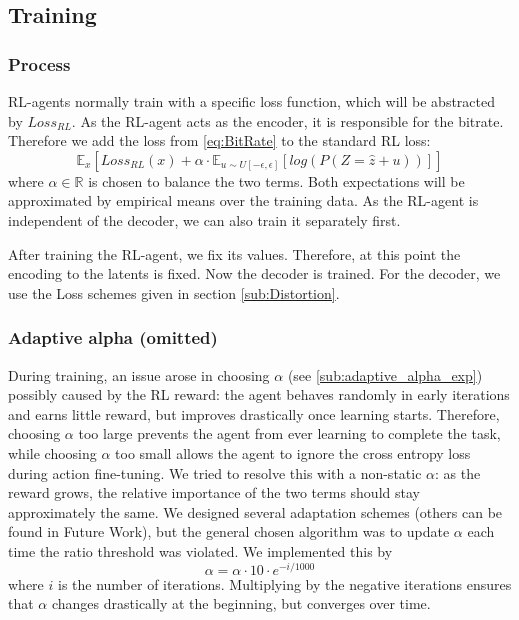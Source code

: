 
\subsection{Training}
    \subsubsection{Process}
        RL-agents normally train with a specific loss function, which will be
        abstracted by $Loss_{RL}$. As the RL-agent acts as the encoder, it
        is responsible for the bitrate. Therefore we add the loss from
        \ref{eq:BitRate} to the standard RL loss:
        \begin{equation}\label{eq:RL_Training_Loss}
            \mathbb{E}_{x}[Loss_{RL}(x) + \alpha\cdot \mathbb{E}_{u \sim U[-\epsilon, \epsilon]}[log(P(Z=\hat{z} + u))]]
        \end{equation} where $\alpha \in \mathbb{R}$ is chosen to balance the two terms.
        Both expectations will be approximated by empirical means over the training
        data. As the RL-agent is independent of the decoder, we can also train it
        separately first.

        After training the RL-agent, we fix its values. Therefore, at this point
        the encoding to the latents is fixed. Now the decoder is trained. For the decoder, we use the Loss
        schemes given in section \ref{sub:Distortion}.


    \subsubsection{Adaptive alpha (omitted)}\label{sub:Adaptive_Alpha}
        During training, an issue arose in choosing $\alpha$ (see \ref{sub:adaptive_alpha_exp}) possibly caused by the RL reward: the agent behaves
        randomly in early iterations and earns little reward, but improves
        drastically once learning starts. Therefore, choosing $\alpha$ too large
        prevents the agent from ever learning to complete the task, while choosing
        $\alpha$ too small allows the agent to ignore the cross entropy loss during action
        fine-tuning. We tried to resolve this with a non-static $\alpha$: as
        the reward grows, the relative importance of the two terms should stay
        approximately the same. We designed several adaptation schemes (others can be
        found in Future Work), but the general chosen algorithm was to update $\alpha$
        each time the ratio threshold was violated. We implemented this by
        \begin{equation}
            \alpha = \alpha \cdot 10 \cdot e^{-i / 1000}
        \end{equation}
        where $i$ is the number of iterations. Multiplying by the negative iterations
        ensures that $\alpha$ changes drastically at the beginning, but
        converges over time.